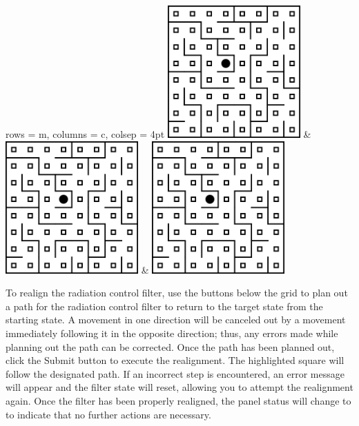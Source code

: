 \documentclass[12pt,draft]{article}
\newcommand{\status}[1]{\fbox{\texttt{#1}}}
\newcommand{\radtable}[1]{
 \begin{tblr}{
  rows = {m}, columns = {c},
  colsep = 0pt
 }
  \status{#1} \\
  \texttt{[image: \#1]}
 \end{tblr}
}
\begin{document}
\begin{center}
\begin{tblr}{
 rows = {m}, columns = {c},
 colsep = 4pt
}
 \includegraphics[width=2in]{AE} & \includegraphics[width=2in]{AE} & \includegraphics[width=2in]{AE}

\end{tblr}
\end{center}



To realign the radiation control filter, use the buttons below the grid to plan out a path for the radiation control filter to return to the target state from the starting state. A movement in one direction will be canceled out by a movement immediately following it in the opposite direction; thus, any errors made while planning out the path can be corrected. Once the path has been planned out, click the Submit button to execute the realignment. The highlighted square will follow the designated path. If an incorrect step is encountered, an error message will appear and the filter state will reset, allowing you to attempt the realignment again. Once the filter has been properly realigned, the panel status will change to \status{BB} to indicate that no further actions are necessary.
\end{document}
